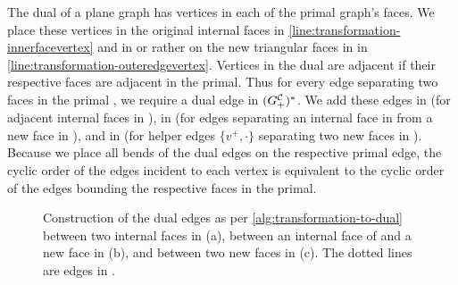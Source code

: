 The dual of a plane graph has vertices in each of the primal graph's faces.
We place these vertices in the original internal faces in \cref{line:transformation-innerfacevertex} and in \emdash{} or rather on \emdash{} the new triangular faces in \clustergraph{+} in \cref{line:transformation-outeredgevertex}.
Vertices in the dual are adjacent if their respective faces are adjacent in the primal.
Thus for every edge separating two faces in the primal \clustergraph{+}, we require a dual edge in $(G^\mathcal{C}_{+})^*$.
We add these edges in  (for adjacent internal faces in \clustergraph{}), in  (for edges separating an internal face in \clustergraph{} from a new face in \clustergraph{+}), and in  (for helper edges $\{v^+,\cdot\}$ separating two new faces in \clustergraph{+}).
Because we place all bends of the dual edges on the respective primal edge, the cyclic order of the edges incident to each vertex is equivalent to the cyclic order of the edges bounding the respective faces in the primal.

\begin{figure}[H]
	\centering
	\quad
	\caption{Construction of the dual edges as per \cref{alg:transformation-to-dual} between two internal faces in \clustergraph{} (a), between an internal face of \clustergraph{} and a new face in \clustergraph{+} (b), and between two new faces in \clustergraph{+} (c). The dotted lines are edges in \clustergraph{}.}
	\label{fig:transformation-dual-edge-construction}
\end{figure}

